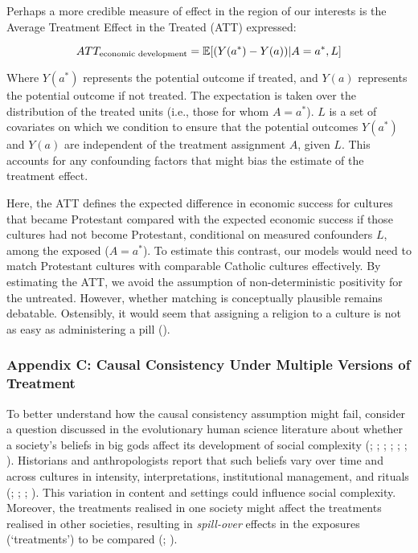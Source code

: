 \documentclass[
  single column]{article}
\begin{document}
Perhaps a more credible measure of effect in the region of our interests
is the Average Treatment Effect in the Treated (ATT) expressed:

\[
ATT_{\textnormal{economic~development}} = \mathbb{E}[(Y(a^*) - Y(a))|A = a^*,L]
\]

Where \(Y(a^*)\) represents the potential outcome if treated, and
\(Y(a)\) represents the potential outcome if not treated. The
expectation is taken over the distribution of the treated units (i.e.,
those for whom \(A = a^*\)). \(L\) is a set of covariates on which we
condition to ensure that the potential outcomes \(Y(a^*)\) and \(Y(a)\)
are independent of the treatment assignment \(A\), given \(L\). This
accounts for any confounding factors that might bias the estimate of the
treatment effect.

Here, the ATT defines the expected difference in economic success for
cultures that became Protestant compared with the expected economic
success if those cultures had not become Protestant, conditional on
measured confounders \(L\), among the exposed (\(A = a^*\)). To estimate
this contrast, our models would need to match Protestant cultures with
comparable Catholic cultures effectively. By estimating the ATT, we
avoid the assumption of non-deterministic positivity for the untreated.
However, whether matching is conceptually plausible remains debatable.
Ostensibly, it would seem that assigning a religion to a culture is not
as easy as administering a pill ().

\newpage{}

\subsubsection{Appendix C: Causal Consistency Under Multiple Versions of
Treatment}\label{id-app-c}

To better understand how the causal consistency assumption might fail,
consider a question discussed in the evolutionary human science
literature about whether a society's beliefs in big gods affect its
development of social complexity (; ;
;
;
;
;
).
Historians and anthropologists report that such beliefs vary over time
and across cultures in intensity, interpretations, institutional
management, and rituals (; ;
;
). This variation in content
and settings could influence social complexity. Moreover, the treatments
realised in one society might affect the treatments realised in other
societies, resulting in \emph{spill-over} effects in the exposures
(`treatments') to be compared (; ).
\end{document}
